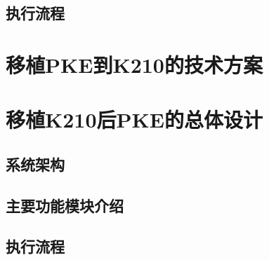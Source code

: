 \subsection{执行流程}

\section{移植PKE到K210的技术方案}

\section{移植K210后PKE的总体设计}

\subsection{系统架构}

\subsection{主要功能模块介绍}

\subsection{执行流程}
